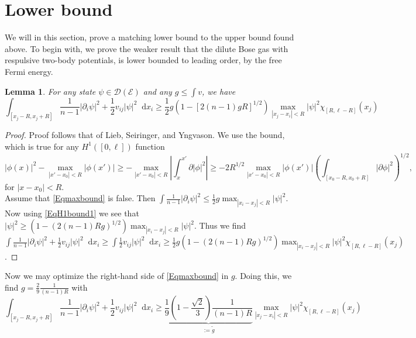 \documentclass[a4paper,11pt]{article}
\newcommand{\abs}[1]{\left\lvert #1 \right\rvert}
\newcommand{\dom}[1]{\mathscr D\left(#1\right)}
\newcommand*\diff{\mathop{}\!\mathrm{d}}
\newtheorem{lemma}{Lemma}
\numberwithin{equation}{section}
\begin{document}
	\section{Lower bound}
	We will in this section, prove a matching lower bound to the upper bound found above. To begin with, we prove the weaker result that the dilute Bose gas with respulsive two-body potentials, is lower bounded to leading order, by the free Fermi energy.
	\begin{lemma}
		For any state $ \psi\in \dom{\mathcal{E}} $ and any $ g\leq \int v $, we have \begin{equation}\label{Eqmaxbound}
		\int_{[x_j-R,x_j+R]} \frac{1}{n-1}\abs{\partial_i\psi}^2+\frac12v_{ij}\abs{\psi}^2 \diff x_i\geq \frac12 g (1-[2(n-1)gR]^{1/2})\max_{\abs{x_j-x_i}<R}\abs{\psi}^2\chi_{[R,\ell-R]}(x_j)
		\end{equation}
	\end{lemma}
	\begin{proof}
		Proof follows that of Lieb, Seiringer, and Yngvason. We use the bound, which is true for any $ H^{1}([0,\ell]) $ function \begin{equation}\label{EqH1bound1}
		\abs{\phi(x)}^2-\max_{\abs{x'-x_0}<R}\abs{\phi(x')}\geq-\max_{\abs{x'-x_0}<R}\abs{\int_{x}^{x'}\partial\abs{\phi}^2}\geq -2R^{1/2}\max_{\abs{x'-x_0}<R}\abs{\phi(x')}\left(\int_{[x_0-R,x_0+R]} \abs{\partial\phi}^2\right)^{1/2},
		\end{equation}
		for $ \abs{x-x_0}<R $.\\
		Assume that \eqref{Eqmaxbound} is false. Then $ \int \frac{1}{n-1}\abs{\partial_i\psi}^2\leq \frac{1}{2}g\max_{\abs{x_i-x_j}<R}\abs{\psi}^2 $. Now using \eqref{EqH1bound1} we see that $ \abs{\psi}^2\geq \left(1-(2(n-1)Rg)^{1/2}\right)\max_{\abs{x_i-x_j}<R}\abs{\psi}^2 $. Thus we find $ \int \frac{1}{n-1}\abs{\partial_i\psi}^2+\frac12v_{ij}\abs{\psi}^2 \diff x_i\geq\int\frac12v_{ij}\abs{\psi}^2 \diff x_i\geq \frac{1}{2}g\left(1-(2(n-1)Rg)^{1/2}\right)\max_{\abs{x_i-x_j}<R}\abs{\psi}^2\chi_{[R,\ell-R]}(x_j) $.
	\end{proof}
	Now we may optimize the right-hand side of \eqref{Eqmaxbound} in $ g $. Doing this, we find $ g=\frac29 \frac{1}{(n-1)R} $ with \begin{equation}\label{Eqmaxbound2}
	\int_{[x_j-R,x_j+R]} \frac{1}{n-1}\abs{\partial_i\psi}^2+\frac12v_{ij}\abs{\psi}^2 \diff x_i\geq \underbrace{\frac{1}{9}\left(1-\frac{\sqrt{2}}{3}\right)\frac{1}{(n-1)R}}_{:=\tilde{g}}\max_{\abs{x_j-x_i}<R}\abs{\psi}^2\chi_{[R,\ell-R]}(x_j)
	\end{equation}
\end{document}
